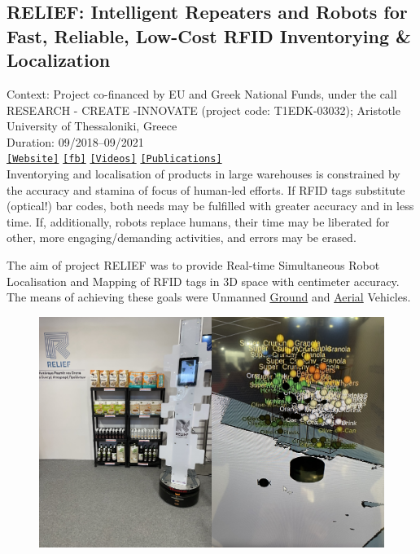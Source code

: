 \subsection{RELIEF: Intelligent Repeaters and Robots for Fast, Reliable, Low-Cost RFID Inventorying \& Localization}

Context: Project co-financed by EU and Greek National Funds, under the call RESEARCH - CREATE -INNOVATE (project code: T1EDK-03032); Aristotle University of Thessaloniki, Greece\\

\noindent Duration: 09/2018--09/2021\\

\noindent \href{http://relief.web.auth.gr/language/en/home/}{\texttt{[Website]}} \href{https://www.facebook.com/ReliefAuth}{\texttt{[fb]}} \href{https://www.youtube.com/@antonidimi/search?query=relief}{\texttt{[Videos]}} \href{https://relief.web.auth.gr/language/en/publications/}{\texttt{[Publications]}} \\

Inventorying and localisation of products in large warehouses is constrained by
the accuracy and stamina of focus of human-led efforts. If RFID tags substitute
(optical!) bar codes, both needs may be fulfilled with greater accuracy and in
less time. If, additionally, robots replace humans, their time may be liberated
for other, more engaging/demanding activities, and errors may be erased.

The aim of project RELIEF was to provide Real-time Simultaneous Robot
Localisation and Mapping of RFID tags in 3D space with centimeter accuracy. The
means of achieving these goals were Unmanned
\href{https://www.youtube.com/watch?v=bo4lMI640DY}{Ground} and
\href{https://www.youtube.com/watch?v=9YpBIaO4tgY}{Aerial} Vehicles.

\begin{figure}[H]\centering
  \includegraphics[scale=0.4]{images/relief_1.png}
  \caption{}
  \label{fig:relief_1}
\end{figure}

